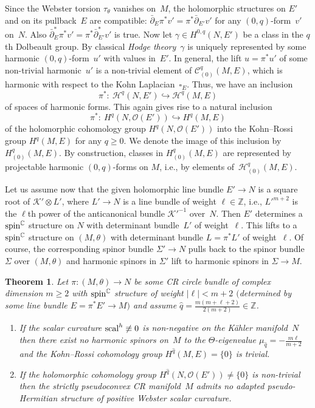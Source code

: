 \documentclass[10pt,a4paper]{amsart}
\numberwithin{equation}{section}
\newtheorem{Theorem}{Theorem}[section]
\newcommand{\ZZ}{\mathbb{Z}}
\newcommand{\CC}{\mathbb{C}}
\begin{document}
Since the Webster torsion $\tau_\theta$ vanishes on~$M$, the holomorphic structures on $E'$ and on its pullback~$E$ are compatible:
$\bar{\partial}_E\pi^*v'=\pi^*\bar{\partial}_{E'}v'$ for any $(0,q)$-form~$v'$ on~$N$.
Also $\bar{\partial}^*_E\pi^*v'=\pi^*\bar{\partial}^*_{E'}v'$ is true.
Now let $\gamma\in H^{0,q}(N,E')$ be a class in the $q$th Dolbeault group. By classical {\em Hodge theory}~$\gamma$ is
uniquely represented by some harmonic $(0,q)$-form~$u'$ with values in~$E'$. In general,
the lift $u=\pi^*u'$ of some non-trivial harmonic~$u'$ is a non-trivial element of $\mathcal{C}_{(0)}^q(M,E)$, which is
harmonic with respect to the Kohn Laplacian~$\square_E$. Thus, we have an inclusion
\[
\pi^*\colon \ \mathcal{H}^q(N,E') \hookrightarrow \mathcal{H}^q(M,E)
\]
of spaces of harmonic forms. This again gives rise to a natural inclusion
\[
\pi^*\colon \ H^q(N,\mathcal{O}(E')) \hookrightarrow H^q(M,E)
\]
of the holomorphic cohomology group $H^q(N,\mathcal{O}(E'))$ into the Kohn--Rossi group $H^q(M,E)$ for any $q\geq 0$.
We denote the image of this inclusion by $H_{(0)}^q(M,E)$. By construction, classes in $H_{(0)}^q(M,E)$ are represented
by projectable harmonic $(0,q)$-forms on $M$, i.e., by elements of~$\mathcal{H}_{(0)}^q(M,E)$.

Let us assume now that the given holomorphic line bundle $E'\to N$ is a square root of $\mathcal{K}'\otimes L'$, where $L'\to N$
is a line bundle of weight $\ell\in\ZZ$, i.e., $L'^{m+2}$ is the $\ell$th power of the anticanonical bundle $\mathcal{K}'^{-1}$ over~$N$. Then $E'$ determines a ${\rm spin}^\CC$ structure on $N$ with determinant bundle~$L'$ of weight~$\ell$. This lifts to a ${\rm spin}^\CC$ structure on $(M,\theta)$ with determinant bundle $L=\pi^*L'$ of weight~$\ell$. Of course, the corresponding spinor bundle $\Sigma'\to N$ pulls back to the spinor bundle
$\Sigma$ over $(M,\theta)$ and harmonic spinors in $\Sigma'$ lift to harmonic spinors in $\Sigma\to M$.

\begin{Theorem} \label{RegVan} Let $\pi\colon (M,\theta)\to N$ be some CR circle bundle of complex dimension $m\geq 2$ with ${\rm spin}^\CC$ structure of weight $|\ell|< m+2$
$($determined by some line bundle $E=\pi^*E'\to M)$ and assume $\hat{q}=\frac{m(m+\ell+2)}{2(m+2)}\in\ZZ$.
\begin{enumerate}\itemsep=0pt
\item[$(a)$] If the scalar curvature ${\rm scal}^h\not\equiv 0$ is non-negative on the K\"ahler manifold~$N$ then
there exist no harmonic spinors on~$M$ to the $\Theta$-eigenvalue $\mu_{\hat{q}}=-\frac{m\ell}{m+2}$ and the Kohn--Rossi cohomology group $H^{\hat{q}}(M,E)=\{0\}$
is trivial.
\item[$(b)$] If the holomorphic cohomology group $H^{\hat{q}}(N,\mathcal{O}(E'))\neq\{0\}$ is non-trivial then the strictly pseudoconvex CR manifold~$M$ admits
no adapted pseudo-Hermitian structure of positive Webster scalar curvature.
\end{enumerate}
\end{Theorem}
\end{document}
